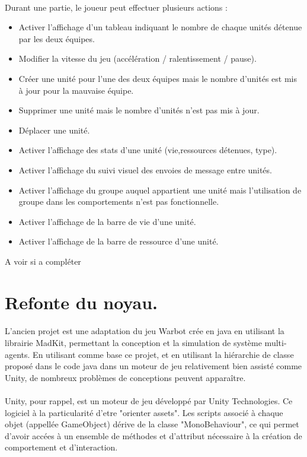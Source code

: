 \documentclass{report}
\begin{document}
\paragraph{}Durant une partie, le joueur peut effectuer plusieurs actions :
\begin{itemize}
\item Activer l'affichage d'un tableau indiquant le nombre de chaque unités détenue par les deux équipes.
\item Modifier la vitesse du jeu (accélération / ralentissement / pause).
\item Créer une unité pour l'une des deux équipes mais le nombre d'unités est mis à jour pour la mauvaise équipe.
\item Supprimer une unité mais le nombre d'unités n'est pas mis à jour.
\item Déplacer une unité.
\item Activer l'affichage des stats d'une unité (vie,ressources détenues, type).
\item Activer l'affichage du suivi visuel des envoies de message entre unités.
\item Activer l'affichage du groupe auquel appartient une unité mais l'utilisation de groupe dans les comportements n'est pas fonctionnelle.
\item Activer l'affichage de la barre de vie d'une unité.
\item Activer l'affichage de la barre de ressource d'une unité.
\end{itemize}

A voir si a compléter

\section{Refonte du noyau.}
\paragraph{}L'ancien projet est une adaptation du jeu Warbot crée en java en utilisant la librairie MadKit, permettant la conception et la simulation de système multi-agents. En utilisant comme base ce projet, et en utilisant la hiérarchie de classe proposé dans le code java dans un moteur de jeu relativement bien assisté comme Unity, de nombreux problèmes de conceptions peuvent apparaître.
\paragraph{}Unity, pour rappel, est un moteur de jeu développé par Unity Technologies. Ce logiciel à la particularité d'etre "orienter assets". Les scripts associé à chaque objet (appellée GameObject) dérive de la classe "MonoBehaviour", ce qui permet d'avoir accées à un ensemble de méthodes et d'attribut nécessaire à la création de comportement et d'interaction.
\end{document}
